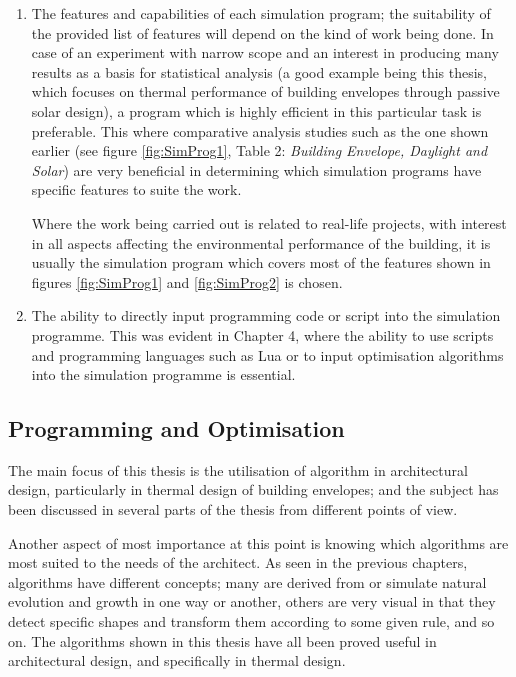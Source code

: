 \begin{enumerate}
	\item The features and capabilities of each simulation program; the suitability of the provided list of features will depend on the kind of work being done. In case of an experiment with narrow scope and an interest in producing many results as a basis for statistical analysis (a good example being this thesis, which focuses on thermal performance of building envelopes through passive solar design), a program which is highly efficient in this particular task is preferable. This where comparative analysis studies such as the one shown earlier (see figure \ref{fig:SimProg1}, Table 2: \emph{Building Envelope, Daylight and Solar}) are very beneficial in determining which simulation programs have specific features to suite the work.

		Where the work being carried out is related to real-life projects, with interest in all aspects affecting the environmental performance of the building, it is usually the simulation program which covers most of the features shown in figures \ref{fig:SimProg1} and \ref{fig:SimProg2} is chosen.
	
	\item The ability to directly input programming code or script into the simulation programme. This was evident in Chapter 4, where the ability to use scripts and programming languages such as Lua or to input optimisation algorithms into the simulation programme is essential.
\end{enumerate}

\clearpage
\subsection{Programming and Optimisation}

The main focus of this thesis is the utilisation of algorithm in architectural design, particularly in thermal design of building envelopes; and the subject has been discussed in several parts of the thesis from different points of view.

Another aspect of most importance at this point is knowing which algorithms are most suited to the needs of the architect. As seen in the previous chapters, algorithms have different concepts; many are derived from or simulate natural evolution and growth in one way or another, others are very visual in that they detect specific shapes and transform them according to some given rule, and so on. The algorithms shown in this thesis have all been proved useful in architectural design, and specifically in thermal design.

